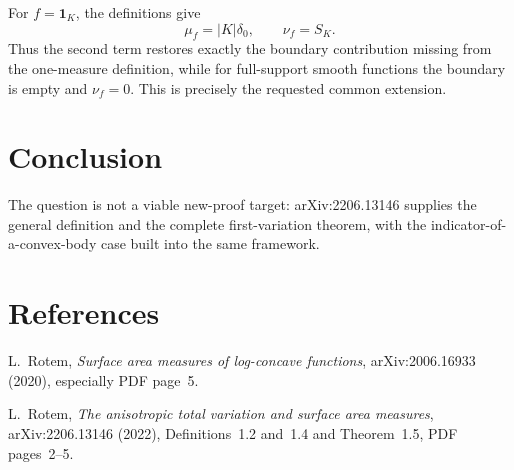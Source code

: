 \documentclass[11pt]{article}
\begin{document}
For $f=\mathbf 1_K$, the definitions give
\[
  \mu_f=|K|\delta_0,
  \qquad
  \nu_f=S_K.
\]
Thus the second term restores exactly the boundary contribution missing from
the one-measure definition, while for full-support smooth functions the
boundary is empty and $\nu_f=0$.  This is precisely the requested common
extension.

\section*{Conclusion}

The question is not a viable new-proof target: arXiv:2206.13146 supplies the
general definition and the complete first-variation theorem, with the
indicator-of-a-convex-body case built into the same framework.

\section*{References}

L.~Rotem, \emph{Surface area measures of log-concave functions},
arXiv:2006.16933 (2020), especially PDF page~5.

L.~Rotem, \emph{The anisotropic total variation and surface area measures},
arXiv:2206.13146 (2022), Definitions~1.2 and~1.4 and Theorem~1.5,
PDF pages~2--5.
\end{document}
